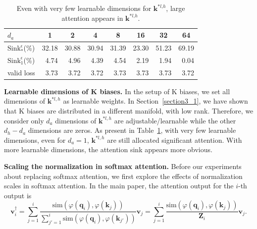 \begin{table}[htbp]
\vspace{-0.2cm}
\caption{Even with very few learnable dimensions for $\boldsymbol{k}^{*l\textrm{,}h}$, large attention appears in $\boldsymbol{k}^{*l\textrm{,}h}$.}
\vspace{-.4cm}
\begin{center}
\begin{tabular}{l|ccccccc}
\toprule
$d_a$ & 1 & 2 & 4 & 8 & 16 & 32  & 64  \\
\midrule
$\textrm{Sink}_{*}^{\epsilon}$(\%) & 32.18 & 30.88 & 30.94 & 31.39 & 23.30 & 51.23 &  69.19 \\
$\textrm{Sink}_{1}^{\epsilon}$(\%) & \,\,\,4.74 &  \,\,\,4.96 & \,\,\,4.39 & \,\,\,4.54 & \,\,\,2.19 & \,\,\,1.94 & \,\,\,0.04 \\
valid loss & \,\,\,3.73 & \,\,\,3.72 & \,\,\,3.72 & \,\,\,3.73 & \,\,\,3.73 & \,\,\,3.73 & \,\,\,3.72 \\
\bottomrule
\end{tabular}
\end{center}
\vspace{-.4cm}
\label{k_low_rank}
\end{table}

\textbf{Learnable dimensions of K biases.} In the setup of K biases, we set all dimensions of $\boldsymbol{k}^{*l\textrm{,}\,h}$ as learnable weights. In Section~\ref{section3_1}, we have shown that K biases are distributed in a different manifold, with low rank. Therefore, we consider only $d_a$ dimensions of $\boldsymbol{k}^{*l\textrm{,}\,h}$ are adjustable/learnable while the other $d_h-d_a$ dimensions are zeros. As present in Table~\ref{k_low_rank}, with very few learnable dimensions, even for $d_a=\textrm{1}$, $\boldsymbol{k}^{*l\textrm{,}\,h}$ are still allocated significant attention. With more learnable dimensions, the attention sink appears more obvious. 

\textbf{Scaling the normalization in softmax attention.} Before our experiments about replacing softmax attention, we first explore the effects of normalization scales in softmax attention. In the main paper, the attention output for the $i$-th output is
\begin{equation}
\boldsymbol{v}_i^{\dagger}=\sum_{j=1}^i\frac{\textrm{sim}(\varphi(\boldsymbol{q}_i)\textrm{,}\,\varphi(\boldsymbol{k}_j))}{\sum_{j'=1}^i\textrm{sim}(\varphi(\boldsymbol{q}_i)\textrm{,}\,\varphi(\boldsymbol{k}_{j'}))}\boldsymbol{v}_j=\sum_{j=1}^i\frac{\textrm{sim}(\varphi(\boldsymbol{q}_i)\textrm{,}\,\varphi(\boldsymbol{k}_j))}{\boldsymbol{Z}_i}\boldsymbol{v}_j\textrm{.}
\end{equation}

